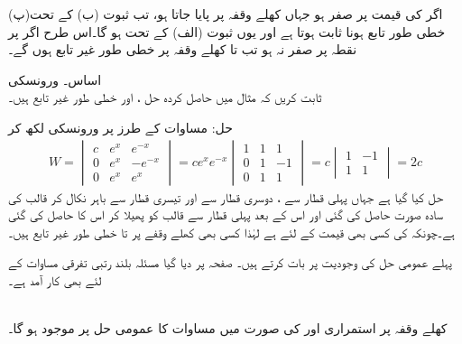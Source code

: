 (پ)\quad اگر  کی قیمت  پر صفر ہو جہاں  کھلے وقفہ  پر پایا جاتا ہو، تب ثبوت (ب) کے تحت خطی طور تابع ہونا ثابت ہوتا ہے اور یوں ثبوت (الف) کے تحت  ہو گا۔اس طرح اگر  پر نقطہ  پر  صفر نہ ہو تب  تا  کھلے وقفہ  پر خطی طور غیر تابع ہوں گے۔

 \quad اساس۔ ورونسکی\\
ثابت کریں کہ مثال  میں حاصل کردہ حل ،  اور  خطی طور غیر تابع ہیں۔

حل: مساوات  کے طرز پر  ورونسکی لکھ کر
\begin{align*}
W=
\begin{vmatrix}
c& e^x& e^{-x}\\
0& e^x & -e^{-x}\\
0&e^x&e^x
\end{vmatrix}
=c e^{x} e^{-x}
\begin{vmatrix}
1& 1& 1\\
0& 1 & -1\\
0&1&1
\end{vmatrix}=
c
\begin{vmatrix}
1& -1\\
1&1
\end{vmatrix}
=2c
\end{align*}
حل کیا گیا ہے جہاں پہلی قطار سے ، دوسری قطار سے  اور تیسری قطار سے  باہر نکال کر قالب کی سادہ صورت حاصل کی گئی اور اس کے بعد پہلی قطار سے قالب کو پھیلا کر اس کا  حاصل کی گئی ہے۔چونکہ  کی کسی بھی قیمت کے لئے   ہے لہٰذا کسی بھی کھلے وقفے پر  تا  خطی طور غیر تابع ہیں۔

پہلے عمومی حل کی وجودیت پر بات کرتے ہیں۔ صفحہ  پر دیا گیا مسئلہ  بلند رتبی تفرقی مساوات کے لئے بھی کار آمد ہے۔

\\
کھلے وقفہ  پر استمراری  اور  کی صورت میں مساوات  کا عمومی حل  پر موجود ہو گا۔

